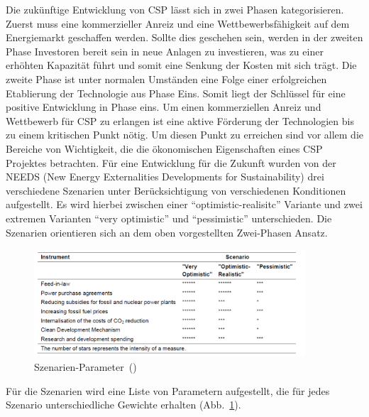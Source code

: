 Die zukünftige Entwicklung von CSP lässt sich in zwei Phasen kategorisieren. Zuerst muss eine kommerzieller Anreiz und eine Wettbewerbsfähigkeit auf dem Energiemarkt geschaffen werden. Sollte dies geschehen sein, werden in der zweiten Phase Investoren bereit sein in neue Anlagen zu investieren, was zu einer erhöhten Kapazität führt und somit eine Senkung der Kosten mit sich trägt. Die zweite Phase ist unter normalen Umständen eine Folge einer erfolgreichen Etablierung der Technologie aus Phase Eins. Somit liegt der Schlüssel für eine positive Entwicklung in Phase eins. Um einen kommerziellen Anreiz und Wettbewerb für CSP zu erlangen ist eine aktive Förderung der Technologien bis zu einem kritischen Punkt nötig. Um diesen Punkt zu erreichen sind vor allem die Bereiche von Wichtigkeit, die die ökonomischen Eigenschaften eines CSP Projektes betrachten.
Für eine Entwicklung für die Zukunft wurden von der NEEDS (New Energy Externalities Developments for Sustainability) drei verschiedene Szenarien unter Berücksichtigung von verschiedenen Konditionen aufgestellt. Es wird hierbei zwischen einer "`optimistic-realisitc"' Variante und zwei extremen Varianten "`very optimistic"' und "`pessimistic"' unterschieden. Die Szenarien orientieren sich an dem oben vorgestellten Zwei-Phasen Ansatz.

\begin{figure}[H]
	\centering
	\includegraphics[width=0.9\textwidth,trim=1 1 1 1,clip]{instruments_scenario.png}
	\caption{Szenarien-Parameter~(\cite{viebahn2008})}
	\label{fig:inst}
\end{figure}

Für die Szenarien wird eine Liste von Parametern aufgestellt, die für jedes Szenario unterschiedliche Gewichte erhalten (Abb.~\ref{fig:inst}).

